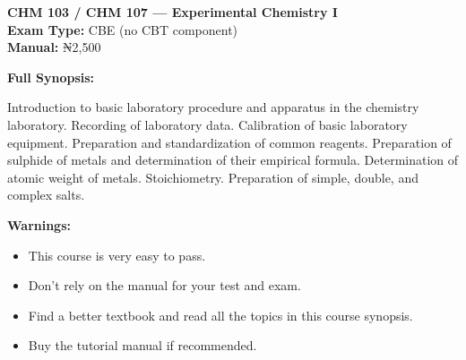 \documentclass[11pt,a4paper]{article}
\begin{document}
\begin{coursebox}
    \textbf{\color{primary}\Large CHM 103 / CHM 107 --- Experimental Chemistry I}\\[0.3em]
    \textbf{Exam Type:} CBE (no CBT component) \\
    \textbf{Manual:} ₦2,500

    \vspace{0.8em}

    \textbf{Full Synopsis:}

    Introduction to basic laboratory procedure and apparatus in the chemistry laboratory. Recording of laboratory data. Calibration of basic laboratory equipment. Preparation and standardization of common reagents. Preparation of sulphide of metals and determination of their empirical formula. Determination of atomic weight of metals. Stoichiometry. Preparation of simple, double, and complex salts.

    \vspace{0.8em}

    \textbf{\color{warningText}Warnings:}
    \begin{itemize}[leftmargin=1.5em, itemsep=0.2em]
        \item This course is very easy to pass.
        \item Don't rely on the manual for your test and exam.
        \item Find a better textbook and read all the topics in this course synopsis.
        \item Buy the tutorial manual if recommended.
    \end{itemize}
\end{coursebox}
\end{document}
